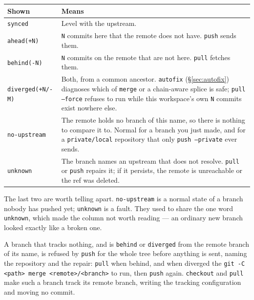 \begin{center}
\begin{tabular}{lp{10.5cm}}
\textbf{Shown} & \textbf{Means} \\
\hline
\texttt{synced}            & Level with the upstream. \\
\texttt{ahead(+N)}         & \texttt{N} commits here that the remote does
                             not have. \texttt{push} sends them. \\
\texttt{behind(-N)}        & \texttt{N} commits on the remote that are not
                             here. \texttt{pull} fetches them. \\
\texttt{diverged(+N/-M)}   & Both, from a common ancestor. \texttt{autofix}
                             (\S\ref{sec:autofix}) diagnoses which of
                             \texttt{merge} or a chain-aware splice is
                             safe; \texttt{pull --force} refuses to
                             run while this workspace's own \texttt{N}
                             commits exist nowhere else. \\
\texttt{no-upstream}       & The remote holds no branch of this name, so
                             there is nothing to compare it to. Normal for a branch
                             you just made, and for a \texttt{private/local}
                             repository that only \texttt{push --private}
                             ever sends. \\
\texttt{unknown}           & The branch names an upstream that does not
                             resolve. \texttt{pull} or \texttt{push} repairs
                             it; if it persists, the remote is unreachable
                             or the ref was deleted. \\
\end{tabular}
\end{center}

The last two are worth telling apart. \texttt{no-upstream} is a normal
state of a branch nobody has pushed yet; \texttt{unknown} is a fault. They
used to share the one word \texttt{unknown}, which made the column not
worth reading --- an ordinary new branch looked exactly like a broken one.

A branch that tracks nothing, and is \texttt{behind} or
\texttt{diverged} from the remote branch of its name, is refused by
\texttt{push} for the whole tree before anything is sent, naming the
repository and the repair: \texttt{pull} when behind, and when diverged the
\texttt{git -C <path> merge <remote>/<branch>} to run, then \texttt{push}
again. \texttt{checkout} and \texttt{pull} make such a branch track its
remote branch, writing the tracking configuration and moving no commit.

